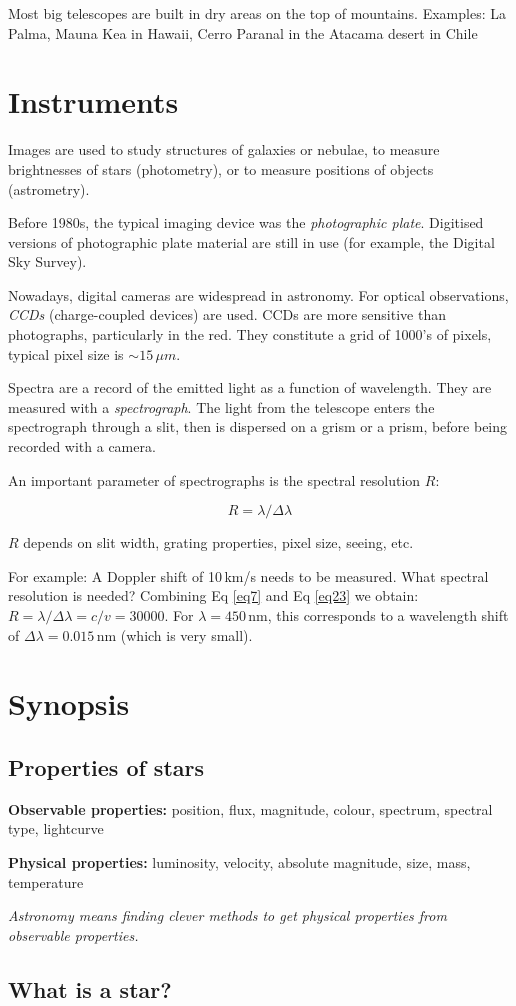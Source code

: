 Most big telescopes are built in dry areas on the top of mountains. Examples: La Palma, Mauna Kea in Hawaii, Cerro Paranal in the Atacama desert in Chile

\section{Instruments}

Images are used to study structures of galaxies or nebulae, to measure brightnesses of stars (photometry), or to measure positions of objects (astrometry).

Before 1980s, the typical imaging device was the \textit{photographic plate}. Digitised versions of photographic plate material are still in use (for example, the Digital Sky Survey).

Nowadays, digital cameras are widespread in astronomy. For optical observations, \textit{CCDs} (charge-coupled devices) are used. CCDs are more sensitive than photographs, particularly in the red. They constitute a grid of 1000's of pixels, typical pixel size is $\sim 15\,\mu m$.

Spectra are a record of the emitted light as a function of wavelength. They are measured with a \textit{spectrograph}. The light from the telescope enters the spectrograph through a slit, then is dispersed on a grism or a prism, before being recorded with a camera.

An important parameter of spectrographs is the spectral resolution $R$:

\begin{equation}
R = \lambda / \Delta\lambda
\label{eq23}
\end{equation}

$R$ depends on slit width, grating properties, pixel size, seeing, etc. 

For example: A Doppler shift of 10\,km/s needs to be measured. What spectral resolution is needed? Combining Eq \ref{eq7} and Eq \ref{eq23} we obtain: $R = \lambda / \Delta\lambda = c / v  = 30000$. For $\lambda = 450$\,nm, this corresponds to a wavelength shift of $\Delta\lambda = 0.015$\,nm (which is very small).

\section{Synopsis}

\subsection{Properties of stars}

\textbf{Observable properties:} position, flux, magnitude, colour, spectrum, spectral type, lightcurve

\textbf{Physical properties:} luminosity, velocity, absolute magnitude, size, mass, temperature

\textit{Astronomy means finding clever methods to get physical properties from observable properties.}

\subsection{What is a star?}



